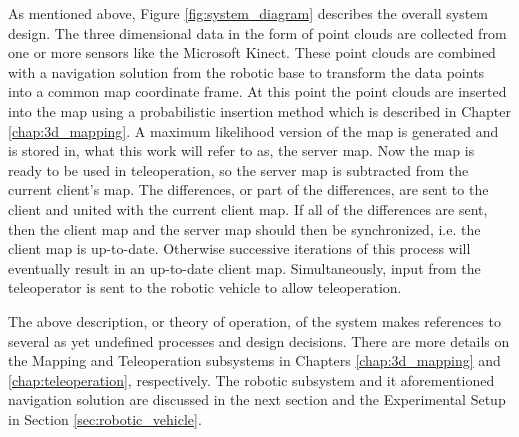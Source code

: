 \documentclass[12pt]{report}
\begin{document}
As mentioned above, Figure \ref{fig:system_diagram} describes the overall system design.  The three dimensional data in the form of point clouds are collected from one or more sensors like the Microsoft Kinect.  These point clouds are combined with a navigation solution from the robotic base to transform the data points into a common map coordinate frame.  At this point the point clouds are inserted into the map using a probabilistic insertion method which is described in Chapter \ref{chap:3d_mapping}.  A maximum likelihood version of the map is generated and is stored in, what this work will refer to as, the server map.  Now the map is ready to be used in teleoperation, so the server map is subtracted from the current client's map.  The differences, or part of the differences, are sent to the client and united with the current client map.  If all of the differences are sent, then the client map and the server map should then be synchronized, i.e. the client map is up-to-date.  Otherwise successive iterations of this process will eventually result in an up-to-date client map.  Simultaneously, input from the teleoperator is sent to the robotic vehicle to allow teleoperation.

The above description, or theory of operation, of the system makes references to several as yet undefined processes and design decisions.  There are more details on the Mapping and Teleoperation subsystems in Chapters \ref{chap:3d_mapping} and \ref{chap:teleoperation}, respectively.  The robotic subsystem and it aforementioned navigation solution are discussed in the next section and the Experimental Setup in Section \ref{sec:robotic_vehicle}.

\end{document}
